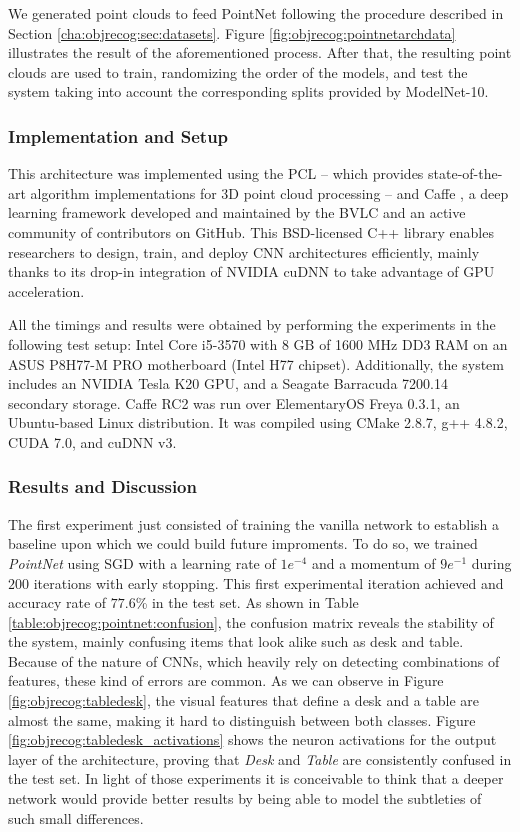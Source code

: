 We generated point clouds to feed PointNet following the procedure described in Section \ref{cha:objrecog:sec:datasets}. Figure \ref{fig:objrecog:pointnetarchdata} illustrates the result of the aforementioned process. After that, the resulting point clouds are used to train, randomizing the order of the models, and test the system taking into account the corresponding splits provided by ModelNet-10.

\subsubsection{Implementation and Setup}

This architecture was implemented using the \ac{PCL} \cite{Rusu2011}\cite{Aldoma2012} – which provides state-of-the-art algorithm implementations for 3D point cloud processing – and Caffe \cite{Jia2014}, a deep learning framework developed and maintained by the \ac{BVLC} and an active community of contributors on GitHub. This BSD-licensed C++ library enables researchers to design, train, and deploy \ac{CNN} architectures efficiently, mainly thanks to its drop-in integration of NVIDIA cuDNN \cite{Chetlur2014} to take advantage of \ac{GPU} acceleration.

All the timings and results were obtained by performing the experiments in the following test setup: Intel Core i5-3570 with 8 GB of 1600 MHz DD3 RAM on an ASUS P8H77-M PRO motherboard (Intel H77 chipset). Additionally, the system includes an NVIDIA Tesla K20 GPU, and a Seagate Barracuda 7200.14 secondary storage. Caffe RC2 was run over ElementaryOS Freya 0.3.1, an Ubuntu-based Linux distribution. It was compiled using CMake 2.8.7, g++ 4.8.2, CUDA 7.0, and cuDNN v3.

\subsubsection{Results and Discussion}
\label{cha:objrecog:sec:pointnet:subsec:discussion}

The first experiment just consisted of training the vanilla network to establish a baseline upon which we could build future improments. To do so, we trained \emph{PointNet} using \ac{SGD} with a learning rate of $1e^{-4}$ and a momentum of $9e^{-1}$ during $200$ iterations with early stopping. This first experimental iteration achieved and accuracy rate of $77.6$\% in the test set. As shown in Table \ref{table:objrecog:pointnet:confusion}, the confusion matrix reveals the stability of the system, mainly confusing items that look alike such as desk and table. Because of the nature of \acp{CNN}, which heavily rely on detecting combinations of features, these kind of errors are common. As we can observe in Figure \ref{fig:objrecog:tabledesk}, the visual features that define a desk and a table are almost the same, making it hard to distinguish between both classes. Figure \ref{fig:objrecog:tabledesk_activations} shows the neuron activations for the output layer of the architecture, proving that \emph{Desk} and \emph{Table} are consistently confused in the test set. In light of those experiments it is conceivable to think that a deeper network would provide better results by being able to model the subtleties of such small differences.

